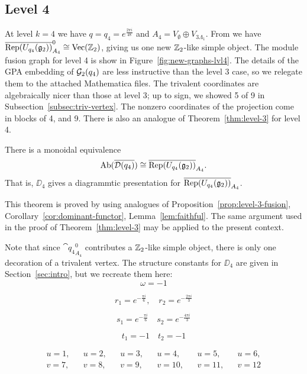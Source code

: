 





\subsection{Level 4}\label{subsec:results-4}
At level $k=4$ we have $q = q_4 = e^{\frac{2\pi i}{48}}$ and 
$A_4=V_\emptyset \oplus V_{3\Lambda_1}$. 
From \cite{DMNO} we have $\overline{\operatorname{Rep}(U_{q_4}(\mathfrak{g}_2))}_{A_4}^0 \cong \operatorname{Vec}(\mathbb{Z}_2)$, giving us one new 
$\mathbb{Z}_2$-like simple object. 
The module fusion graph for level 4 is show in Figure~\ref{fig:new-graphs-lvl4}.
The details of the GPA embedding of $\mathcal{G}_2(q_4)$ are less instructive than the level 3 case, 
so we relegate them to the attached Mathematica files. 
The trivalent coordinates are algebraically nicer than those at level 3; 
up to sign, we showed 5 of 9 in Subsection~\ref{subsec:triv-vertex}. 
The nonzero coordinates of the projection come in blocks of 4, and 9. 
There is also an analogue of Theorem~\ref{thm:level-3} for level 4.

\begin{theorem}\label{thm:level-4}
    There is a monoidal equivalence
    \[
        \operatorname{Ab}(\overline{\mathcal{D}(q_4)}) \cong \overline{ \operatorname{Rep}(U_{q_4}(\mathfrak{g}_2))}_{A_4}.
    \]
    That is, $\DD_4$ gives a diagrammtic presentation for $\overline{ \operatorname{Rep}(U_{q_4}(\mathfrak{g}_2))}_{A_4}$.
\end{theorem}

This theorem is proved by using analogues of Proposition~\ref{prop:level-3-fusion}, 
Corollary~\ref{cor:dominant-functor}, Lemma~\ref{lem:faithful}.
The same argument used in the proof of Theorem~\ref{thm:level-3} may be applied to the present context.

Note that since $\cat{q_4}_{A_4}^0$ contributes a $\mathbb{Z}_2$-like simple object, 
there is only one decoration of a trivalent vertex.
The structure constants for $\DD_4$ are given in Section~\ref{sec:intro}, but we recreate them here:
\begin{equation*}
    \omega = -1
\end{equation*}

\begin{equation*}
    r_1 = e^{-\frac{\pi i}{6}}, \quad r_2 = e^{-\frac{2\pi i}{3}}
\end{equation*}

\begin{equation*}
    s_1 = e^{-\frac{\pi i}{6}} \quad s_2 = e^{-\frac{4\pi i}{3}}
\end{equation*}

\begin{equation*}
    t_1 = -1 \quad t_2 = -1
\end{equation*}

\begin{align*}
    u = 1, && u = 2, && u = 3, && u = 4, && u = 5, && u = 6, \\
    v = 7, && v = 8, && v = 9, && v = 10, && v = 11, && v = 12 
\end{align*}








